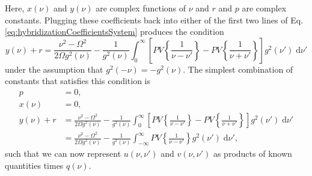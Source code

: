 \documentclass{article}
\begin{document}
Here, $x(\nu)$ and $y(\nu)$ are complex functions of $\nu$ and $r$ and $p$ are complex constants. Plugging these coefficients back into either of the first two lines of Eq. \eqref{eq:hybridizationCoefficientsSystem} produces the condition
\begin{equation}
y(\nu) + r = \frac{\nu^2 - \Omega^2}{2\Omega g^2(\nu)} - \frac{1}{g^2(\nu)}\int_0^\infty\left[PV\left\{\frac{1}{\nu - \nu'}\right\} - PV\left\{\frac{1}{\nu + \nu'}\right\}\right]g^2(\nu')\;\mathrm{d}\nu'
\end{equation}
under the assumption that $g^2(-\nu) = -g^2(\nu)$. The simplest combination of constants that satisfies this condition is
\begin{equation}
\begin{split}
p &= 0,\\
x(\nu) &= 0,\\
y(\nu) + r &= \frac{\nu^2 - \Omega^2}{2\Omega g^2(\nu)} - \frac{1}{g^2(\nu)}\int_0^\infty\left[PV\left\{\frac{1}{\nu - \nu'}\right\} - PV\left\{\frac{1}{\nu + \nu'}\right\}\right]g^2(\nu')\;\mathrm{d}\nu'\\
&= \frac{\nu^2 - \Omega^2}{2\Omega g^2(\nu)} - \frac{1}{g^2(\nu)}\int_{-\infty}^\infty PV\left\{\frac{1}{\nu - \nu'}\right\}g^2(\nu')\;\mathrm{d}\nu',
\end{split}
\end{equation}
such that we can now represent $u(\nu,\nu')$ and $v(\nu,\nu')$ as products of known quantities times $q(\nu)$.
\end{document}
